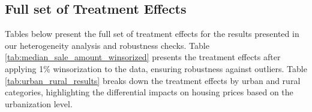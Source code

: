 \subsection{Full set of Treatment Effects}

Tables below present the full set of treatment effects for the results presented in our heterogeneity analysis and robustness checks. Table \ref{tab:median_sale_amount_winsorized} presents the treatment effects after applying 1\% winsorization to the data, ensuring robustness against outliers. Table \ref{tab:urban_rural_results} breaks down the treatment effects by urban and rural categories, highlighting the differential impacts on housing prices based on the urbanization level.
